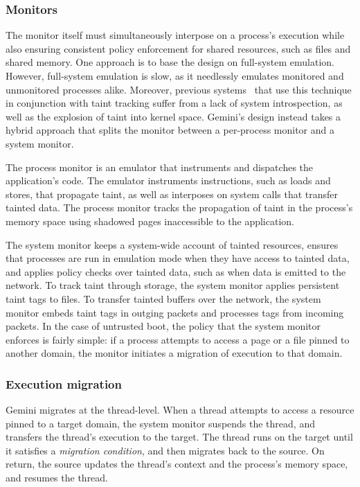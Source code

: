\subsubsection{Monitors}
%
The monitor itself must simultaneously interpose on a process's execution while
also ensuring consistent policy enforcement for shared resources, such as files
and shared memory.
%
One approach is to base the design on full-system emulation.
%
However, full-system emulation is slow, as it needlessly emulates
monitored and unmonitored processes alike.
%
Moreover, previous
systems~\cite{whole-system-simulation,panorama,demand-emulation} that use this
technique in conjunction with taint tracking suffer from a lack of system
introspection, as well as the explosion of taint into kernel space.
%
Gemini's design instead takes a hybrid approach that splits the monitor between a
per-process monitor and a system monitor.



%
The process monitor is an emulator that instruments and dispatches the
application's code.
%
The emulator instruments instructions, such as
loads and stores, that propagate taint, as well as interposes on
system calls that transfer tainted data.
%
The process monitor tracks the propagation of taint in the process's
memory space using shadowed pages inaccessible to the application.
%

The system monitor keeps a system-wide account of tainted resources,
ensures that processes are run in emulation mode when they have access to
tainted data, and applies policy checks over tainted data, such as when data is
emitted to the network.
%
To track taint through storage, the system monitor applies persistent
taint tags to files.
%
To transfer tainted buffers over the network, the system monitor embeds taint
tags in outging packets and processes tags from incoming packets.
%
In the case of untrusted boot, the policy that the system monitor enforces is
fairly simple: if a process attempts to access a page or a file pinned to
another domain, the monitor initiates a migration of execution to that domain.


\subsubsection{Execution migration}

Gemini migrates at the thread-level.
%
When a thread attempts to access a resource pinned to a target domain,
the system monitor suspends the thread, and transfers the
thread's execution to the target.
%
The thread runs on the target until it satisfies a \emph{migration condition},
and then migrates back to the source.
%
On return, the source updates the thread's context and the process's memory
space, and resumes the thread.


